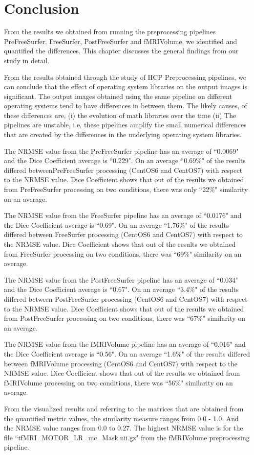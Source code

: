 \chapter{Conclusion}
From the results we obtained from running the preprocessing pipelines PreFreeSurfer, FreeSurfer, PostFreeSurfer and fMRIVolume, we identified and quantified the differences. This chapter discusses the general findings from our study in detail.

From the results obtained through the study of HCP Preprocessing pipelines, we can conclude that the effect of operating system libraries on the output images is significant. The output images obtained using the same pipeline on different operating systems tend to have differences in between them. The likely causes, of these differences are, (i) the evolution of math libraries over the time (ii) The pipelines are unstable, i.e, these pipelines amplify the small numerical differences that are created by the differences in the underlying operating system libraries. 

The NRMSE value from the PreFreeSurfer pipeline has an average of ``0.0069" and the Dice Coefficient average is ``0.229". On an average ``0.69\%" of the results differed betweenPreFreeSurfer processing (CentOS6 and CentOS7) with respect to the NRMSE value. Dice Coefficient shows that out of the results we obtained from PreFreeSurfer processing on two conditions, there was only ``22\%" similarity on an average.

The NRMSE value from the FreeSurfer pipeline has an average of ``0.0176" and the Dice Coefficient average is ``0.69". On an average ``1.76\%" of the results differed between FreeSurfer processing (CentOS6 and CentOS7) with respect to the NRMSE value. Dice Coefficient shows that out of the results we obtained from FreeSurfer processing on two conditions, there was ``69\%" similarity on an average.

The NRMSE value from the PostFreeSurfer pipeline has an average of ``0.034" and the Dice Coefficient average is ``0.67". On an average ``3.4\%" of the results differed between PostFreeSurfer processing (CentOS6 and CentOS7) with respect to the NRMSE value. Dice Coefficient shows that out of the results we obtained from PostFreeSurfer processing on two conditions, there was ``67\%" similarity on an average.

The NRMSE value from the fMRIVolume pipeline has an average of ``0.016" and the Dice Coefficient average is ``0.56". On an average ``1.6\%" of the results differed between fMRIVolume processing (CentOS6 and CentOS7) with respect to the NRMSE value. Dice Coefficient shows that out of the results we obtained from fMRIVolume processing on two conditions, there was ``56\%" similarity on an average.

From the visualized results and referring to the matrices that are obtained from the quantified metric values, the similarity measure ranges from 0.0 - 1.0. And the NRMSE value ranges from 0.0 to 0.27. The highest NRMSE value is for the file ``tfMRI\_MOTOR\_LR\_mc\_Mask.nii.gz" from the fMRIVolume preprocessing pipeline.


